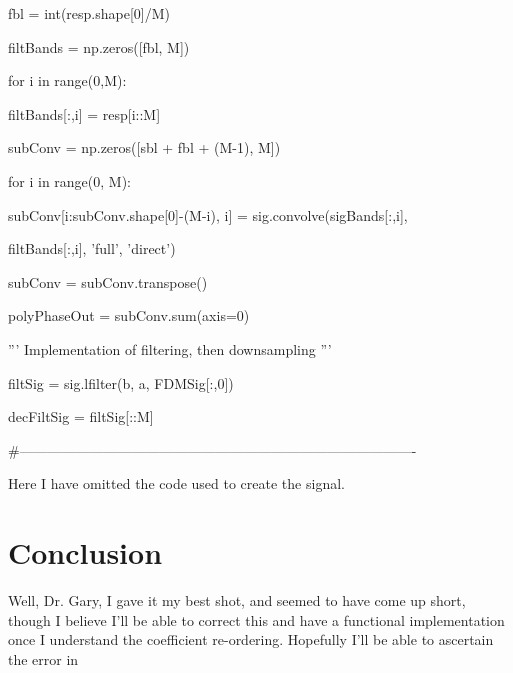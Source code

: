 \documentclass{report}
\begin{document}
fbl = int(resp.shape[0]/M)

filtBands = np.zeros([fbl, M])

for i in range(0,M):

    filtBands[:,i] = resp[i::M]
    
subConv = np.zeros([sbl + fbl + (M-1), M])

for i in range(0, M):

    subConv[i:subConv.shape[0]-(M-i), i] = sig.convolve(sigBands[:,i], 
    
            filtBands[:,i], 'full', 'direct')
            
subConv = subConv.transpose()

polyPhaseOut = subConv.sum(axis=0)

'''
Implementation of filtering, then downsampling
'''

filtSig = sig.lfilter(b, a, FDMSig[:,0])

decFiltSig = filtSig[::M]

\#-------------------------------------------------------------------------------------

Here I have omitted the code used to create the signal.

\chapter{Conclusion}

Well, Dr. Gary, I gave it my best shot, and seemed to have come up short, though I believe I'll be able to correct this and have a functional implementation once I understand the coefficient re-ordering.  Hopefully I'll be able to ascertain the error in 
\end{document}
